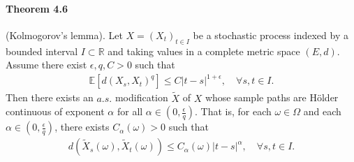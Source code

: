 \documentclass{article}
\numberwithin{equation}{section}
\newcommand{\E}{\mathbb{E}}
\theoremstyle{plain}
\theoremstyle{definition}
\begin{document}
\paragraph{Theorem 4.6\label{thm:4.6}} (Kolmogorov's lemma). Let $X=(X_t)_{t\in I}$ be a stochastic process indexed by a bounded interval $I\subset\mathbb{R}$ and taking values in a complete metric space $(E,d)$. Assume there exist $\epsilon,q,C>0$ such that
\begin{align*}
	\E\left[d(X_s,X_t)^q\right]\leq C\vert t-s\vert^{1+\epsilon},\quad \forall s,t\in I.
\end{align*}
Then there exists an $a.s.$ modification $\widetilde{X}$ of $X$ whose sample paths are Hölder continuous of exponent $\alpha$ for all $\alpha\in(0,\frac{\epsilon}{q})$. That is, for each $\omega\in\Omega$ and each $\alpha\in(0,\frac{\epsilon}{q})$, there exists $C_\alpha(\omega)>0$ such that
\begin{align*}
	d(\widetilde{X}_s(\omega),\widetilde{X}_t(\omega)) \leq C_\alpha(\omega)\vert t-s\vert^{\alpha},\quad\forall s,t\in I.
\end{align*}
\end{document}
